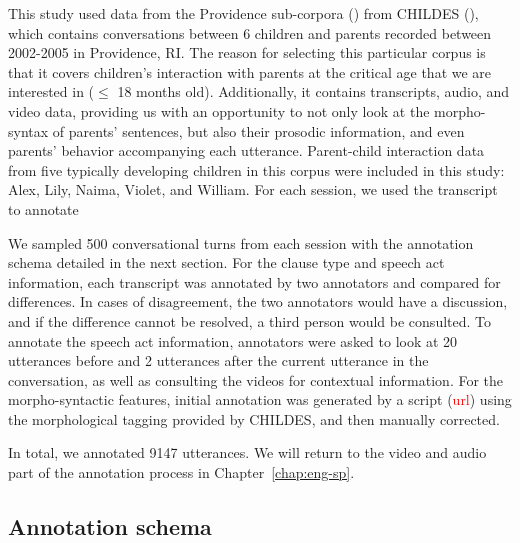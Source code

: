 This study used data from the Providence sub-corpora (\cite{ProvidenceCorpus}) from CHILDES (\cite{CHILDES}), which contains conversations between 6 children and parents recorded between 2002-2005 in Providence, RI. The reason for selecting this particular corpus is that it covers children’s interaction with parents at the critical age that we are interested in ($\leq$ 18 months old). Additionally, it contains transcripts, audio, and video data, providing us with an opportunity to not only look at the morpho-syntax of parents’ sentences, but also their prosodic information, and even parents’ behavior accompanying each utterance. Parent-child interaction data from five typically developing children in this corpus were included in this study: Alex, Lily, Naima, Violet, and William. For each session, we used the transcript to annotate  

We sampled 500 conversational turns from each session with the annotation schema detailed in the next section. For the clause type and speech act information, each transcript was annotated by two annotators and compared for differences. In cases of disagreement, the two annotators would have a discussion, and if the difference cannot be resolved, a third person would be consulted. To annotate the speech act information, annotators were asked to look at 20 utterances before and 2 utterances after the current utterance in the conversation, as well as consulting the videos for contextual information. For the morpho-syntactic features, initial annotation was generated by a script (\textcolor{red}{url}) using the morphological tagging provided by CHILDES, and then manually corrected. 

In total, we annotated 9147 utterances. We will return to the video and audio part of the annotation process in Chapter~\ref{chap:eng-sp}.




\subsection{Annotation schema}
\label{sec:engcl:corpus:schema}

